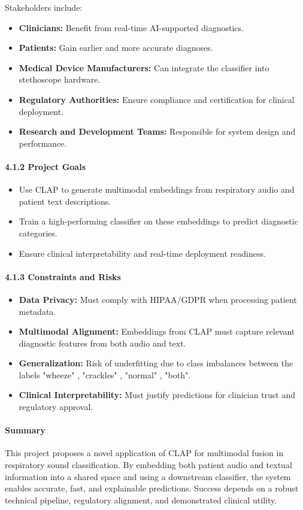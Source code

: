 Stakeholders include:
\begin{itemize}
    \item \textbf{Clinicians:} Benefit from real-time AI-supported diagnostics.
    \item \textbf{Patients:} Gain earlier and more accurate diagnoses.
    \item \textbf{Medical Device Manufacturers:} Can integrate the classifier into stethoscope hardware.
    \item \textbf{Regulatory Authorities:} Ensure compliance and certification for clinical deployment.
    \item \textbf{Research and Development Teams:} Responsible for system design and performance.
\end{itemize}

\paragraph{4.1.2 Project Goals}
\begin{itemize}
    \item Use CLAP to generate multimodal embeddings from respiratory audio and patient text descriptions.
    \item Train a high-performing classifier on these embeddings to predict diagnostic categories.
    \item Ensure clinical interpretability and real-time deployment readiness.
\end{itemize}

\paragraph{4.1.3 Constraints and Risks}
\begin{itemize}
    \item \textbf{Data Privacy:} Must comply with HIPAA/GDPR when processing patient metadata.
    \item \textbf{Multimodal Alignment:} Embeddings from CLAP must capture relevant diagnostic features from both audio and text.
    \item \textbf{Generalization:} Risk of underfitting due to class imbalances between the labels "wheeze" , "crackles" , "normal" , "both".
    \item \textbf{Clinical Interpretability:} Must justify predictions for clinician trust and regulatory approval.
\end{itemize}

\paragraph{Summary \\}
This project proposes a novel application of CLAP for multimodal fusion in respiratory sound classification. By embedding both patient audio and textual information into a shared space and using a downstream classifier, the system enables accurate, fast, and explainable predictions. Success depends on a robust technical pipeline, regulatory alignment, and demonstrated clinical utility.

